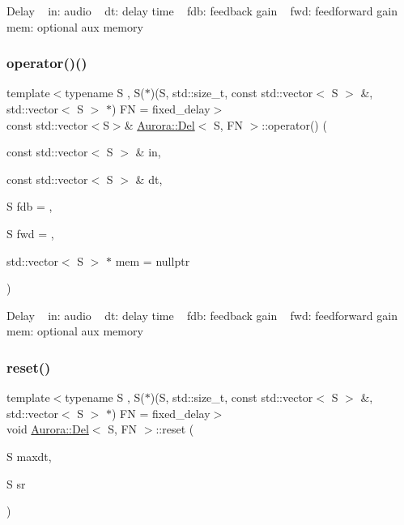 Delay ~\newline
in\+: audio ~\newline
dt\+: delay time ~\newline
fdb\+: feedback gain ~\newline
fwd\+: feedforward gain mem\+: optional aux memory \mbox{\label{class_aurora_1_1_del_a3e02b9da60ffefe345b905a55c26fa16}} 
\subsubsection{\texorpdfstring{operator()()}{operator()()}\hspace{0.1cm}{\footnotesize\ttfamily [2/2]}}
{\footnotesize\ttfamily template$<$typename S , S($\ast$)(\+S, std\+::size\+\_\+t, const std\+::vector$<$ S $>$ \&, std\+::vector$<$ S $>$ $\ast$) FN = fixed\+\_\+delay$>$ \\
const std\+::vector$<$S$>$\& \hyperlink{class_aurora_1_1_del}{Aurora\+::\+Del}$<$ S, FN $>$\+::operator() (\begin{DoxyParamCaption}\item[{const std\+::vector$<$ S $>$ \&}]{in,  }\item[{const std\+::vector$<$ S $>$ \&}]{dt,  }\item[{S}]{fdb = {},  }\item[{S}]{fwd = {},  }\item[{std\+::vector$<$ S $>$ $\ast$}]{mem = {\ttfamily nullptr} }\end{DoxyParamCaption})\hspace{0.3cm}{\ttfamily [inline]}}

Delay ~\newline
in\+: audio ~\newline
dt\+: delay time ~\newline
fdb\+: feedback gain ~\newline
fwd\+: feedforward gain ~\newline
mem\+: optional aux memory \mbox{\label{class_aurora_1_1_del_adcb695eca560d6ead399a8bbafef9025}} 
\subsubsection{\texorpdfstring{reset()}{reset()}}
{\footnotesize\ttfamily template$<$typename S , S($\ast$)(\+S, std\+::size\+\_\+t, const std\+::vector$<$ S $>$ \&, std\+::vector$<$ S $>$ $\ast$) FN = fixed\+\_\+delay$>$ \\
void \hyperlink{class_aurora_1_1_del}{Aurora\+::\+Del}$<$ S, FN $>$\+::reset (\begin{DoxyParamCaption}\item[{S}]{maxdt,  }\item[{S}]{sr }\end{DoxyParamCaption})\hspace{0.3cm}{\ttfamily [inline]}}

